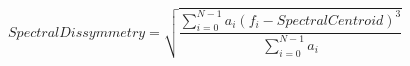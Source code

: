 \begin{equation}
\mathit{SpectralDissymmetry} = \sqrt{\frac{\sum_{i=0}^{N-1} a_i (f_i - \mathit{SpectralCentroid})^3}{\sum_{i=0}^{N-1} a_i}}
\label{formula_spectral_dissymmetry}
\end{equation}
